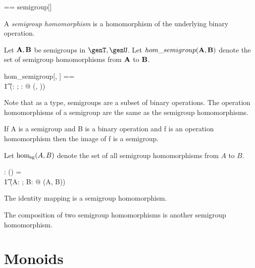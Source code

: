 \documentclass{amsart}
\begin{document}
\begin{zed}
	\semigroup \genT == semigroup[\genT]
\end{zed}

\begin{remark}
\begin{zed}
	\semigroup \setT \subseteq \binop \setT
\end{zed}
\end{remark}

A \textit{semigroup homomorphism} is a homomorphism of the underlying binary operation.

Let $\mathbf{A}, \mathbf{B}$ be semigroups in $\genT, \genU$.
Let $hom\_semigroup(\mathbf{A}, \mathbf{B})$ denote the set of semigroup homomorphisms from $\mathbf{A}$ to $\mathbf{B}$.

\begin{zed}
	hom\_semigroup[\genT, \genU] == \\
	\t1	(\lambda \strucA: \semigroup \genT; \strucB: \semigroup \genU @ \homBinOp(\strucA, \strucB))
\end{zed}

Note that as a type, semigroups are a subset of binary operations.
The operation homomorphisms of a semigroup are the same as the semigroup homomorphisms.

If A is a semigroup and B is a binary operation and f is an operation homomorphism then the image of f is a semigroup.

Let $\operatorname{hom_{sg}}(A, B)$ denote the set of all semigroup homomorphisms from $A$ to $B$.

\begin{gendef}[\genT, \genU]
	\homSemigroup: \semigroup \genT \cross \semigroup \genU \fun \power (\genT \pfun \genU)
\where
	\homSemigroup = \\
	\t1	(\lambda A: \semigroup \genT; B: \semigroup \genU @ \homBinOp(A, B))
\end{gendef}

\begin{remark}
The identity mapping is a semigroup homomorphism.
\end{remark}

\begin{remark}
The composition of two semigroup homomorphisms is another semigroup homomorphism.
\end{remark}

\section{Monoids}
\end{document}
